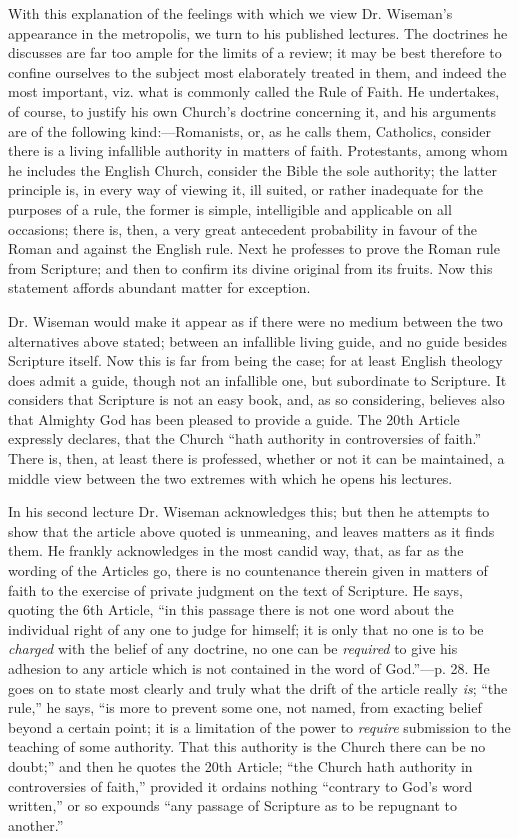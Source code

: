 With this
explanation of the feelings with which we view Dr. Wiseman's
appearance in the metropolis, we turn to his published lectures. The
doctrines he discusses are far too ample for the limits of a review; it
may be best therefore to confine ourselves to the subject most
elaborately treated in them, and indeed the most important, viz. what is
commonly called the Rule of Faith. He undertakes, of course, to justify
his own Church's doctrine concerning it, and his arguments are of the
following kind:—Romanists, or, as he calls them, Catholics, consider
there is a living infallible authority in matters of faith. Protestants,
among whom he includes the English Church, consider the Bible the sole
authority; the latter principle is, in every way of viewing it, ill
suited, or rather inadequate for the purposes of a rule, the former is
simple, intelligible and applicable on all occasions; there is, then, a
very great antecedent probability in favour of the Roman and against the
English rule. Next he professes to prove the Roman rule from Scripture;
and then to confirm its divine original from its fruits. Now this
statement affords abundant matter for exception.

Dr. Wiseman
would make it appear as if there were no medium between the two
alternatives above stated; between an infallible living guide, and no
guide besides Scripture itself. Now this is far from being the case; for
at least English theology does admit a guide, though not an infallible
one, but subordinate to Scripture. It considers that Scripture is not an
easy book, and, as so considering, believes also that Almighty God has
been pleased to provide a guide. The 20th Article expressly declares,
that the Church ``hath authority in controversies of faith.'' There
is, then, at least there is professed, whether or not it can be
maintained, a middle view between the two extremes with which he opens
his lectures.

In his
second lecture Dr. Wiseman acknowledges this; but then he attempts to
show that the article above quoted is unmeaning, and leaves matters as
it finds them. He frankly acknowledges in the most candid way, that, as
far as the wording of the Articles go, there is no countenance therein
given in matters of faith to the exercise of private judgment on the
text of Scripture. He says, quoting the 6th Article, ``in this passage
there is not one word about the individual right of any one to judge for
himself; it is only that no one is to be \emph{charged} with the belief
of any doctrine, no one can be \emph{required} to give his adhesion to
any article which is not contained in the word of God.''—p. 28. He
goes on to state most clearly and truly what the drift of the article
really \emph{is}; ``the rule,'' he says, ``is more to prevent some
one, not named,
from exacting belief beyond a certain point; it is a limitation of the
power to \emph{require} submission to the teaching of some authority.
That this authority is the Church there can be no doubt;'' and then he
quotes the 20th Article; ``the Church hath authority in controversies
of faith,'' provided it ordains nothing ``contrary to God's word
written,'' or so expounds ``any passage of Scripture as to be
repugnant to another.''

